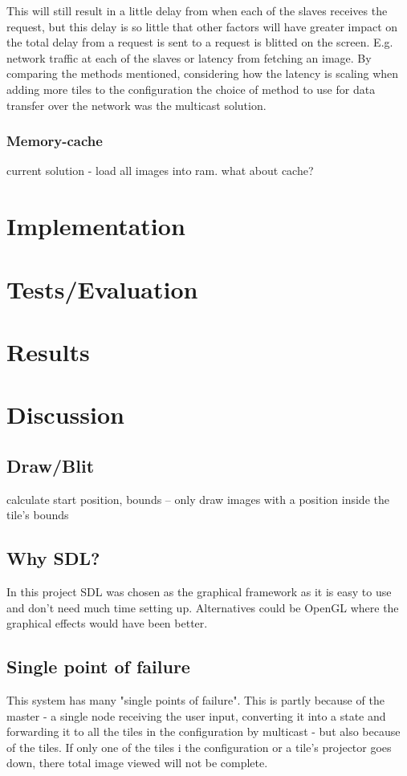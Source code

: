 \documentclass[12pt, a4paper, oneside]{article}
\begin{document}
This will still result in a little delay from when each of the slaves receives the request, but this delay is so little that other factors will have greater impact on the total delay from a request is sent to a request is blitted on the screen. E.g. network traffic at each of the slaves or latency from fetching an image.
\newline
\newline
By comparing the methods mentioned, considering how the latency is scaling when adding more tiles to the configuration the choice of method to use for data transfer over the network was the multicast solution. 

\subsubsection{Memory-cache}
current solution - load all images into ram. what about cache?

\section{Implementation}
\section{Tests/Evaluation}
\section{Results}
\section{Discussion}
\subsection{Draw/Blit}
calculate start position, bounds – only draw images with a position inside the tile's bounds
\subsection{Why SDL?}
In this project SDL was chosen as the graphical framework as it is easy to use and don't need much time setting up. Alternatives could be OpenGL where the graphical effects would have been better. 

\subsection{Single point of failure}
This system has many "single points of failure". This is partly because of the master - a single node receiving the user input, converting it into a state and forwarding it to all the tiles in the configuration by multicast - but also because of the tiles. If only one of the tiles i the configuration or a tile's projector goes down, there total image viewed will not be complete.  
\end{document}
